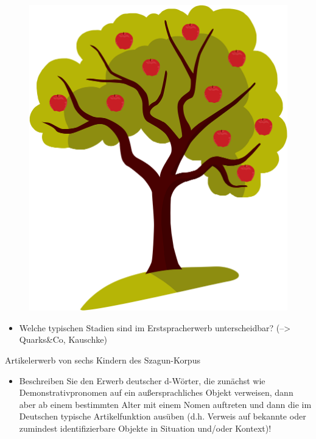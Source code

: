 \documentclass[
  letterpaper,
]{scrbook}
\providecommand{\tightlist}{%
  \setlength{\itemsep}{0pt}\setlength{\parskip}{0pt}}\usepackage{longtable,booktabs,array}
\begin{document}
\begin{figure}

{\centering 

\href{https://www.clipartmax.com/middle/m2i8K9K9G6i8b1A0_apple-tree-technology/}{\includegraphics[width=1\textwidth,height=\textheight]{./pictures/clipart46442.png}}

}

\end{figure}

\begin{itemize}
\tightlist
\item
  Welche typischen Stadien sind im Erstspracherwerb unterscheidbar?
  (--\textgreater{} Quarks\&Co, Kauschke)
\end{itemize}

Artikelerwerb von sechs Kindern des Szagun-Korpus

\begin{itemize}
\tightlist
\item
  Beschreiben Sie den Erwerb deutscher d-Wörter, die zunächst wie
  Demonstrativpronomen auf ein außersprachliches Objekt verweisen, dann
  aber ab einem bestimmten Alter mit einem Nomen auftreten und dann die
  im Deutschen typische Artikelfunktion ausüben (d.h. Verweis auf
  bekannte oder zumindest identifizierbare Objekte in Situation und/oder
  Kontext)!
\end{itemize}
\end{document}
